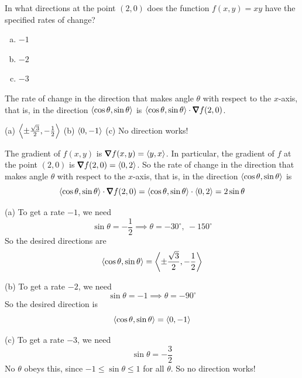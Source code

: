 \begin{question}
 In what directions at the point $(2,0)$ does the function $f(x,y)=xy$
have the specified rates of change? 
\begin{enumerate}[(a)]
\item 
$-1$
\item
$-2$
\item
$-3$
\end{enumerate}
\end{question}

\begin{hint}
The rate of change in the direction that makes angle $\theta$ with
respect to the $x$-axis, that is, in the direction 
$\left< \cos\theta,\sin\theta\right>$ is 
$
\llt \cos\theta,\sin\theta\rgt \cdot\vnabla f(2,0)
$.
\end{hint}


\begin{answer}
(a) $\left<\pm\frac{\sqrt{3}}{2} ,-\frac{1}{2} \right>$\qquad
(b) $\left< 0 ,-1 \right>$ \qquad
(c) No direction works!

\end{answer}

\begin{solution}
The gradient of $f(x,y)$ is $\vnabla f(x,y)=\llt y,x\rgt$. In particular,
the gradient of $f$ at the point $(2,0)$ is
$\vnabla f(2,0)=\llt 0,2 \rgt$. So the rate of change in the direction 
that makes angle $\theta$ with respect to the $x$-axis, that is, 
in the direction 
$\left< \cos\theta,\sin\theta\right>$ is 
\begin{equation*}
\llt \cos\theta,\sin\theta\rgt \cdot\vnabla f(2,0)
=\llt \cos\theta,\sin\theta\rgt \cdot\llt 0, 2\rgt =2\sin\theta
\end{equation*}

(a) To get a rate $-1$, we need
\begin{equation*}
 \sin\theta=-\frac{1}{2} \implies \theta=-30^\circ,\ -150^\circ
\end{equation*}
So the desired directions are
\begin{equation*}
\left< \cos\theta,\sin\theta\right>
=\left<\pm\frac{\sqrt{3}}{2} ,-\frac{1}{2} \right>
\end{equation*}

(b) To get a rate $-2$, we need
\begin{equation*}
 \sin\theta=-1 \implies \theta=-90^\circ
\end{equation*}
So the desired direction is
\begin{equation*}
\left< \cos\theta,\sin\theta\right>
=\left< 0 ,-1 \right>
\end{equation*}

(c) To get a rate $-3$, we need
\begin{equation*}
 \sin\theta=-\frac{3}{2}
\end{equation*}
No $\theta$ obeys this, since $-1\le\sin\theta\le 1$ for all $\theta$. 
So no direction works!
\end{solution}

